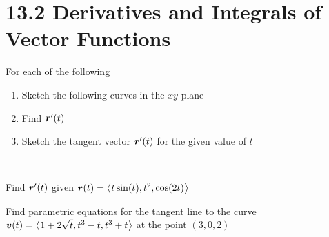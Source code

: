 \documentclass[12pt]{exam}
\begin{document}
\section*{13.2  Derivatives and Integrals of Vector Functions}

\begin{questions}

\question For each of the following 
    \begin{enumerate}[label=$(\roman*)$]
        \item Sketch the following curves in the \(xy\)-plane
        \item Find \(\bm{r}'(t)\)
        \item Sketch the tangent vector \(\bm{r}'(t)\) for the given value of \(t\)
    \end{enumerate}

~


    \newpage

\question Find \(\bm{r}'(t)\) given \(\bm{r}(t)=\left\langle t\sin(t),t^2,\cos(2t) \right\rangle\)
    
\ifprintanswers
        \begin{solution}

        \end{solution}
    \else
        \vfill
    \fi

\question Find parametric equations for the tangent line to the curve \(\bm{v}(t)=\left\langle 1+2\sqrt{t},t^3-t,t^3+t \right\rangle\) at the point \((3,0,2)\)
    

\end{questions}
\end{document}
